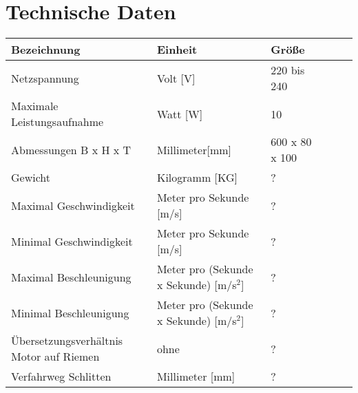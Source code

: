 %
%

\chapter{Technische Daten}
	\fontsize{8}{10}\selectfont
\begin{tabularx}{\textwidth}{|X|X|X|X|p{1cm}|X|}
	\hline 
	\textbf{Bezeichnung} & \textbf{Einheit} & \textbf{Größe} \\ \hline
	Netzspannung & Volt [V] & 220 bis 240  \\
	\hline
	Maximale Leistungsaufnahme & Watt [W] & 10  \\
	\hline
    Abmessungen B x H x T & Millimeter[mm] & 600 x 80 x 100 \\
    \hline
    Gewicht & Kilogramm [KG] & ? \\
    \hline 
    Maximal Geschwindigkeit & Meter pro Sekunde [m/s] & ?\\
    \hline	
    Minimal Geschwindigkeit & Meter pro Sekunde [m/s] & ?\\
    \hline
    Maximal Beschleunigung & Meter pro (Sekunde x Sekunde) [m/s$^{2}$] & ? \\
    \hline
    Minimal Beschleunigung & Meter pro (Sekunde x Sekunde) [m/s$^{2}$] & ? \\
    \hline
    Übersetzungsverhältnis Motor auf Riemen & ohne & ?\\
    \hline
    Verfahrweg Schlitten & Millimeter [mm] & ? \\
    \hline
    \end{tabularx}





